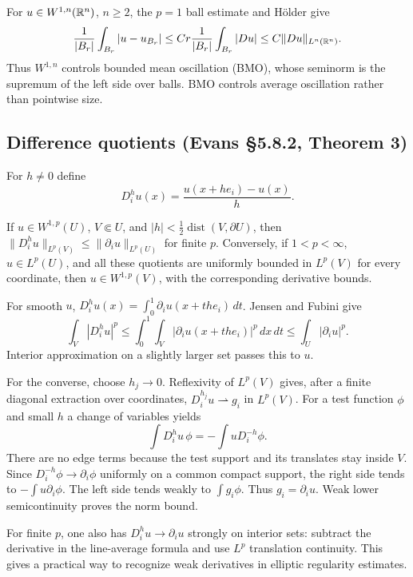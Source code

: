For $u\in W^{1,n}(\mathbb{R}^n)$, $n\geq2$, the $p=1$ ball estimate and H\"older give
\[
 \frac1{|B_r|}\int_{B_r}|u-u_{B_r}|
 \leq Cr\frac1{|B_r|}\int_{B_r}|Du|
 \leq C\|Du\|_{L^n(\mathbb{R}^n)}.
\]
Thus $W^{1,n}$ controls bounded mean oscillation (BMO), whose seminorm
is the supremum of the left side over balls. BMO controls average
oscillation rather than pointwise size.
\Needspace{45mm}

\subsection{Difference quotients (Evans \S5.8.2, Theorem 3)}
For $h\ne0$ define
\[
 D_i^hu(x)=\frac{u(x+he_i)-u(x)}h.
\]
\begin{theorem}\label{thm:5-difference}
If $u\in W^{1,p}(U)$, $V\Subset U$, and
$|h|<\frac12\operatorname{dist}(V,\partial U)$, then
$\|D_i^hu\|_{L^p(V)}\leq\|\partial_i u\|_{L^p(U)}$ for finite $p$.
Conversely, if $1<p<\infty$, $u\in L^p(U)$, and all these quotients
are uniformly bounded in $L^p(V)$ for every coordinate, then
$u\in W^{1,p}(V)$, with the corresponding derivative bounds.
\end{theorem}
\begin{expandedproof}
For smooth $u$,
$D_i^hu(x)=\int_0^1\partial_i u(x+the_i)\,dt$.
Jensen and Fubini give
\[
 \int_V|D_i^hu|^p
 \leq\int_0^1\int_V|\partial_i u(x+the_i)|^p\,dx\,dt
 \leq\int_U|\partial_i u|^p.
\]
Interior approximation on a slightly larger set passes this to $u$.

For the converse, choose $h_j\to0$. Reflexivity of $L^p(V)$ gives,
after a finite diagonal extraction over coordinates,
$D_i^{h_j}u\rightharpoonup g_i$ in $L^p(V)$.
For a test function $\phi$ and small $h$ a change of variables yields
\[
 \int D_i^hu\,\phi=-\int uD_i^{-h}\phi.
\]
There are no edge terms because the test support and its translates
stay inside $V$. Since $D_i^{-h}\phi\to\partial_i\phi$ uniformly on
a common compact support, the right side tends to
$-\int u\partial_i\phi$. The left side tends weakly to $\int g_i\phi$.
Thus $g_i=\partial_i u$. Weak lower semicontinuity proves the norm bound.
\end{expandedproof}
\Needspace{45mm}

For finite $p$, one also has $D_i^hu\to\partial_i u$ strongly on
interior sets: subtract the derivative in the line-average formula
and use $L^p$ translation continuity. This gives a practical way to
recognize weak derivatives in elliptic regularity estimates.

